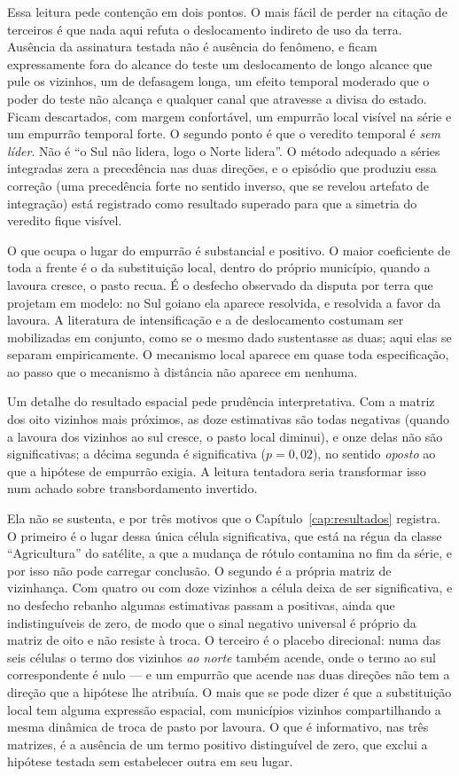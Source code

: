 Essa leitura pede contenção em dois pontos. O mais fácil de perder na citação
de terceiros é que nada aqui refuta o deslocamento indireto de uso da terra.
Ausência da assinatura testada não é ausência do fenômeno, e ficam
expressamente fora do alcance do teste um deslocamento de longo alcance que
pule os vizinhos, um de defasagem longa, um efeito temporal moderado que o
poder do teste não alcança e qualquer canal que atravesse a divisa do estado.
Ficam descartados, com margem confortável, um empurrão local visível na série
e um empurrão temporal forte. O segundo ponto é que o veredito temporal é
\emph{sem líder}. Não é ``o Sul não lidera, logo o Norte lidera''. O método
adequado a séries integradas zera a precedência nas duas direções, e o
episódio que produziu essa correção (uma precedência forte no sentido inverso,
que se revelou artefato de integração) está registrado como resultado superado
para que a simetria do veredito fique visível.

O que ocupa o lugar do empurrão é substancial e positivo. O maior coeficiente
de toda a frente é o da substituição local, dentro do próprio município,
quando a lavoura cresce, o pasto recua. É o desfecho observado da disputa por
terra que  projetam em modelo: no Sul goiano ela aparece
resolvida, e resolvida a favor da lavoura. A literatura de intensificação e a
de deslocamento costumam ser mobilizadas em conjunto, como se o mesmo dado
sustentasse as duas; aqui elas se separam empiricamente. O mecanismo local
aparece em quase toda especificação, ao passo que o mecanismo à distância não
aparece em nenhuma.

Um detalhe do resultado espacial pede prudência interpretativa. Com a matriz
dos oito vizinhos mais próximos, as doze estimativas são todas negativas
(quando a lavoura dos vizinhos ao sul cresce, o pasto local diminui), e onze
delas não são significativas; a décima segunda é significativa ($p = 0{,}02$),
no sentido \emph{oposto} ao que a hipótese de empurrão exigia. A leitura
tentadora seria transformar isso num achado sobre transbordamento invertido.

Ela não se sustenta, e por três motivos que o Capítulo~\ref{cap:resultados}
registra. O primeiro é o lugar dessa única célula significativa, que está na
régua da classe ``Agricultura'' do satélite, a que a mudança de rótulo
contamina no fim da série, e por isso não pode carregar conclusão. O segundo é
a própria matriz de vizinhança. Com quatro ou com doze vizinhos a célula deixa
de ser significativa, e no desfecho rebanho algumas estimativas passam a
positivas, ainda que indistinguíveis de zero, de modo que o sinal negativo
universal é próprio da matriz de oito e não resiste à troca. O terceiro é
o placebo direcional: numa das seis células o termo dos vizinhos \emph{ao
norte} também acende, onde o termo ao sul correspondente é nulo --- e um
empurrão que acende nas duas direções não tem a direção que a hipótese lhe
atribuía. O mais que se pode dizer é que a substituição local tem alguma
expressão espacial, com municípios vizinhos compartilhando a mesma dinâmica de
troca de pasto por lavoura. O que é informativo, nas três matrizes, é a
ausência de um termo positivo distinguível de zero, que exclui a hipótese
testada sem estabelecer outra em seu lugar.

